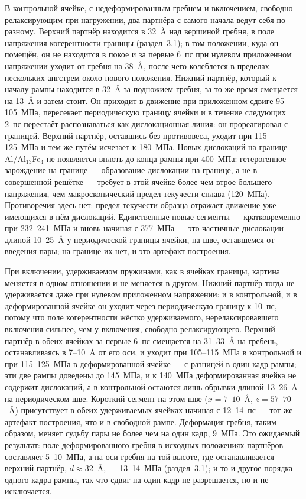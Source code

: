В контрольной ячейке, с недеформированным гребнем и включением, свободно
релаксирующим при нагружении, два партнёра с самого начала ведут себя
по-разному. Верхний партнёр находится в 32~\AA{} над
вершиной гребня, в поле напряжения когерентности границы (раздел~3.1); в
том положении, куда он помещён, он не находится в покое и за первые 6~пс при
нулевом приложенном напряжении уходит от гребня на 38~\AA{},
после чего колеблется в пределах нескольких ангстрем около нового положения.
Нижний партнёр, который к началу рампы находится в 32~\AA{} за
подножием гребня, за то же время смещается на
13~\AA{} и затем стоит. Он приходит в движение при приложенном
сдвиге 95--105~МПа, пересекает периодическую границу ячейки и в
течение следующих 2~пс перестаёт распознаваться как дислокационная линия:
он прореагировал с границей. Верхний партнёр, оставшись без противовеса,
уходит при 115--125~МПа и тем же путём исчезает к
180~МПа. Новых дислокаций на границе Al/Al$_{13}$Fe$_4$ не появляется вплоть до конца рампы при 400~МПа: гетерогенное зарождение на границе --- образование дислокации на границе, а не в совершенной решётке --- требует в этой ячейке более чем втрое большего напряжения, чем макроскопический предел текучести сплава (120~МПа). Противоречия здесь нет: предел текучести образца отражает движение уже имеющихся в нём дислокаций. Единственные новые сегменты --- кратковременно при 232--241~МПа и вновь начиная с 377~МПа --- это частичные дислокации длиной 10--25~\AA{} у периодической границы ячейки, на шве, оставшемся от введения пары; на границе их нет, и это артефакт построения.

При включении, удерживаемом пружинами, как в ячейках границы, картина
меняется в одном отношении и не меняется в другом. Нижний партнёр тогда не
удерживается даже при нулевом приложенном напряжении: и в контрольной, и в
деформированной ячейке он уходит через периодическую границу к 10~пс,
потому что поле когерентности жёстко удерживаемого, нерелаксировавшего
включения сильнее, чем у включения, свободно релаксирующего. Верхний партнёр
в обеих ячейках за первые 6~пс смещается на 31--33~\AA{} на гребень,
останавливаясь в 7--10~\AA{} от его оси, и уходит при 105--115~МПа в
контрольной и при 115--125~МПа в деформированной ячейке --- с разницей в
один кадр рампы; эти две рампы доведены до 145~МПа, и к 140~МПа
деформированная ячейка не содержит дислокаций, а в контрольной остаются
лишь обрывки длиной 13--26~\AA{} на периодическом шве. Короткий сегмент на
этом шве ($x = 7$--$10$~\AA{}, $z = 57$--$70$~\AA{}) присутствует в обеих
удерживаемых ячейках начиная с 12--14~пс --- тот же артефакт построения,
что и в свободной рампе. Деформация гребня, таким образом, меняет судьбу
пары не более чем на один кадр, 9~МПа. Это ожидаемый результат: поле
деформированного гребня в исходных положениях партнёров составляет
5--10~МПа, а на оси гребня на той высоте, где останавливается верхний
партнёр, $d \approx 32$~\AA{}, --- 13--14~МПа (раздел~3.1); и то и другое
порядка одного кадра рампы, так что сдвиг на один кадр не разрешается, но и
не исключается.

